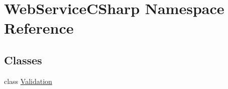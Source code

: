 \hypertarget{namespace_web_service_c_sharp}{}\section{Web\+Service\+C\+Sharp Namespace Reference}
\label{namespace_web_service_c_sharp}
\subsection*{Classes}
\begin{DoxyCompactItemize}
\item 
class \hyperlink{class_web_service_c_sharp_1_1_validation}{Validation}
\end{DoxyCompactItemize}
